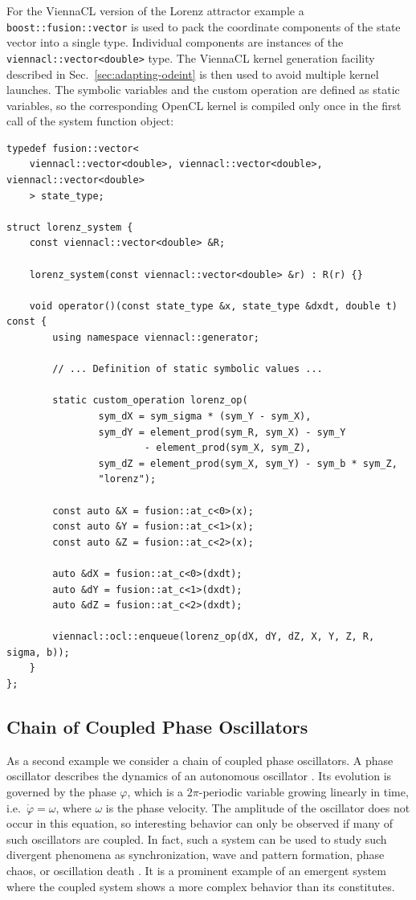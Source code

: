 \documentclass[final]{siamltex}
\newcommand{\code}[1]{\lstinline|#1|}
\begin{document}
For the ViennaCL version of the Lorenz attractor example a
\code{boost::fusion::vector} is used to pack the coordinate components of the
state vector into a single type. Individual components are instances of the
\code{viennacl::vector<double>} type.  The ViennaCL kernel generation facility described in
Sec.~\ref{sec:adapting-odeint} is then used to avoid multiple kernel launches.
The symbolic variables and the custom operation
are defined as static variables, so the corresponding OpenCL kernel is compiled
only once in the first call of the system function object:
\begin{lstlisting}
typedef fusion::vector<
    viennacl::vector<double>, viennacl::vector<double>, viennacl::vector<double>
    > state_type;

struct lorenz_system {
    const viennacl::vector<double> &R;

    lorenz_system(const viennacl::vector<double> &r) : R(r) {}

    void operator()(const state_type &x, state_type &dxdt, double t) const {
        using namespace viennacl::generator;

        // ... Definition of static symbolic values ...

        static custom_operation lorenz_op(
                sym_dX = sym_sigma * (sym_Y - sym_X),
                sym_dY = element_prod(sym_R, sym_X) - sym_Y
                        - element_prod(sym_X, sym_Z),
                sym_dZ = element_prod(sym_X, sym_Y) - sym_b * sym_Z,
                "lorenz");

        const auto &X = fusion::at_c<0>(x);
        const auto &Y = fusion::at_c<1>(x);
        const auto &Z = fusion::at_c<2>(x);

        auto &dX = fusion::at_c<0>(dxdt);
        auto &dY = fusion::at_c<1>(dxdt);
        auto &dZ = fusion::at_c<2>(dxdt);

        viennacl::ocl::enqueue(lorenz_op(dX, dY, dZ, X, Y, Z, R, sigma, b));
    }
};
\end{lstlisting}



%
%
\subsection{Chain of Coupled Phase Oscillators}

As a second example we consider a chain of coupled phase
oscillators. A phase oscillator describes the dynamics of an
autonomous oscillator \cite{PhaseOscillator}. Its evolution is
governed by the phase $\varphi$, which is a $2\pi$-periodic variable growing linearly
in time, i.e.~$\dot{\varphi} = \omega$, where $\omega$ is the phase
velocity. The amplitude of the oscillator does not occur in this
equation, so interesting behavior can only be observed if many
of such oscillators are coupled. In fact, such a system can be used to
study such divergent phenomena as synchronization, wave and pattern
formation, phase chaos, or oscillation death
\cite{Kuramoto-84,Synchronization-Pikovsky}. It is a prominent example
of an emergent system where the coupled system shows a more complex
behavior than its constitutes.
\end{document}
